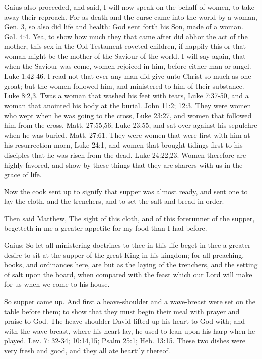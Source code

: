 Gaius also proceeded, and said, I will now speak on the behalf of women, to take away their reproach. For as death and the curse came into the world by a woman, Gen. 3, so also did life and health: God sent forth his Son, made of a woman. Gal. 4:4. Yea, to show how much they that came after did abhor the act of the mother, this sex in the Old Testament coveted children, if happily this or that woman might be the mother of the Saviour of the world. I will say again, that when the Saviour was come, women rejoiced in him, before either man or angel. Luke 1:42-46. I read not that ever any man did give unto Christ so much as one groat; but the women followed him, and ministered to him of their substance. Luke 8:2,3. Twas a woman that washed his feet with tears, Luke 7:37-50, and a woman that anointed his body at the burial. John 11:2; 12:3. They were women who wept when he was going to the cross, Luke 23:27, and women that followed him from the cross, Matt. 27:55,56; Luke 23:55, and sat over against his sepulchre when he was buried. Matt. 27:61. They were women that were first with him at his resurrection-morn, Luke 24:1, and women that brought tidings first to his disciples that he was risen from the dead. Luke 24:22,23. Women therefore are highly favored, and show by these things that they are sharers with us in the grace of life.

Now the cook sent up to signify that supper was almost ready, and sent one to lay the cloth, and the trenchers, and to set the salt and bread in order.

Then said Matthew, The sight of this cloth, and of this forerunner of the supper, begetteth in me a greater appetite for my food than I had before.

Gaius: So let all ministering doctrines to thee in this life beget in thee a greater desire to sit at the supper of the great King in his kingdom; for all preaching, books, and ordinances here, are but as the laying of the trenchers, and the setting of salt upon the board, when compared with the feast which our Lord will make for us when we come to his house.

So supper came up. And first a heave-shoulder and a wave-breast were set on the table before them; to show that they must begin their meal with prayer and praise to God. The heave-shoulder David lifted up his heart to God with; and with the wave-breast, where his heart lay, he used to lean upon his harp when he played. Lev. 7: 32-34; 10:14,15; Psalm 25:1; Heb. 13:15. These two dishes were very fresh and good, and they all ate heartily thereof.

